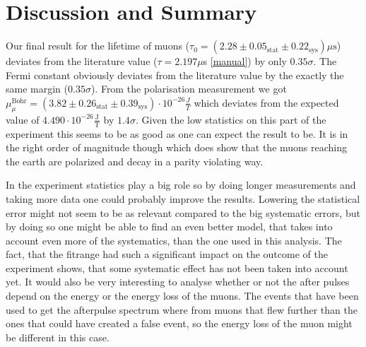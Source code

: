 \section{Discussion and Summary}
Our final result for the lifetime of muons ($\tau_0=(2.28\pm0.05_{\text{stat}}\pm0.22_{\text{sys}})\mu\text{s}$) deviates from the literature value ($\tau = 2.197 \mu$s \ref{manual}) by only $0.35\sigma$. The Fermi constant obviously deviates from the literature value by the exactly the same margin ($0.35\sigma$). From the polarisation measurement we got $	\mu_{\mu}^{\text{Bohr}} = (3.82\pm0.26_{\text{stat}}\pm0.39_{\text{sys}})\cdot10^{-26}\frac{J}{T}
$ which deviates from the expected value of $4.490\cdot 10^{-26}\frac{\text{J}}{\text{T}}$ by $1.4\sigma$. Given the low statistics on this part of the experiment this seems to be as good as one can expect the result to be. It is in the right order of magnitude though which does show that the muons reaching the earth are polarized and decay in a parity violating way. 

In the experiment statistics play a big role so by doing longer measurements and taking more data one could probably improve the results. Lowering the statistical error might not seem to be as relevant compared to the big systematic errors, but by doing so one might be able to find an even better model, that takes into account even more of the systematics, than the one used in this analysis. The fact, that the fitrange had such a significant impact on the outcome of the experiment shows, that some systematic effect has not been taken into account yet. It would also be very interesting to analyse whether or not the after pulses depend on the energy or the energy loss of the muons. The events that have been used to get the afterpulse spectrum where from muons that flew further than the ones that could have created a false event, so the energy loss of the muon might be different in this case. 
